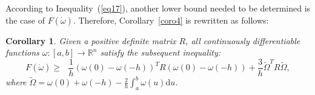 \documentclass[journal]{IEEEtran}
\newtheorem{corollary}[theorem]{Corollary}
\begin{document}
According to Inequality~(\ref{eq17}), another lower bound needed to be determined is the case of $ F(\dot \omega ) $. Therefore, Corollary~\ref{coro4} is rewritten as follows:
\begin{corollary}
  \label{coro5}
  Given a positive definite matrix $R$, all continuously differentiable functions $\omega : [a,b] \to \mathbb{R}^n$ satisfy the subsequent inequality:
  \begin{equation}
    \label{eq24}
    F(\dot \omega ) \geqslant {\text{ }}\frac{1}{h}{(\omega (0) - \omega ( - h))^T}R(\omega (0) - \omega ( - h)) + \frac{3}{h}{\tilde \Omega ^T}R\tilde \Omega,
  \end{equation}
  where $ \tilde \Omega  = \omega (0) + \omega ( - h) - \frac{2}{h}\int_a^b \omega  (u){\text{d}}u $.
\end{corollary}
\end{document}
